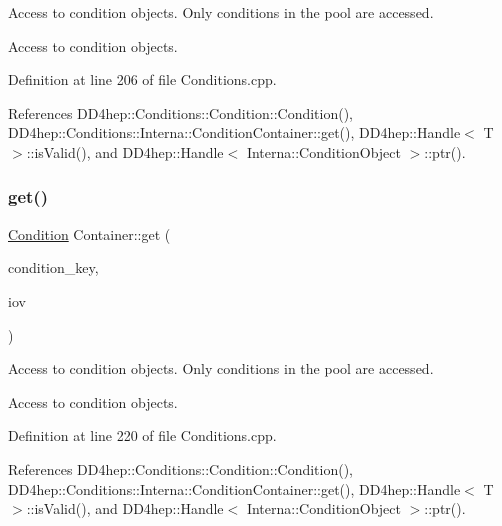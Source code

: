 Access to condition objects. Only conditions in the pool are accessed. 

Access to condition objects. 

Definition at line 206 of file Conditions.\+cpp.



References D\+D4hep\+::\+Conditions\+::\+Condition\+::\+Condition(), D\+D4hep\+::\+Conditions\+::\+Interna\+::\+Condition\+Container\+::get(), D\+D4hep\+::\+Handle$<$ T $>$\+::is\+Valid(), and D\+D4hep\+::\+Handle$<$ Interna\+::\+Condition\+Object $>$\+::ptr().

\hypertarget{class_d_d4hep_1_1_conditions_1_1_container_a6364c939553b81e4c5e05ac98d7f01a0}{}\label{class_d_d4hep_1_1_conditions_1_1_container_a6364c939553b81e4c5e05ac98d7f01a0} 
\subsubsection{\texorpdfstring{get()}{get()}\hspace{0.1cm}{\footnotesize\ttfamily [4/4]}}
{\footnotesize\ttfamily \hyperlink{class_d_d4hep_1_1_conditions_1_1_condition}{Condition} Container\+::get (\begin{DoxyParamCaption}\item[{\hyperlink{class_d_d4hep_1_1_conditions_1_1_container_a65e62d9e4a43b9b0e9e46a7b80876a21}{key\+\_\+type}}]{condition\+\_\+key,  }\item[{const \hyperlink{class_d_d4hep_1_1_conditions_1_1_user_pool}{User\+Pool} \&}]{iov }\end{DoxyParamCaption})}



Access to condition objects. Only conditions in the pool are accessed. 

Access to condition objects. 

Definition at line 220 of file Conditions.\+cpp.



References D\+D4hep\+::\+Conditions\+::\+Condition\+::\+Condition(), D\+D4hep\+::\+Conditions\+::\+Interna\+::\+Condition\+Container\+::get(), D\+D4hep\+::\+Handle$<$ T $>$\+::is\+Valid(), and D\+D4hep\+::\+Handle$<$ Interna\+::\+Condition\+Object $>$\+::ptr().

\hypertarget{class_d_d4hep_1_1_conditions_1_1_container_a95b375e1bc0e962b8e226467f6b39221}{}\label{class_d_d4hep_1_1_conditions_1_1_container_a95b375e1bc0e962b8e226467f6b39221} 
